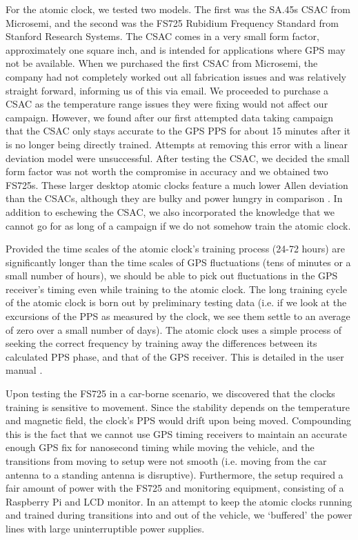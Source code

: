 For the atomic clock, we tested two models. The first was the SA.45s CSAC from Microsemi, and the second was the FS725 Rubidium Frequency Standard from Stanford Research Systems. The CSAC comes in a very small form factor, approximately one square inch, and is intended for applications where GPS may not be available. When we purchased the first CSAC from Microsemi, the company had not completely worked out all fabrication issues and was relatively straight forward, informing us of this via email. We proceeded to purchase a CSAC as the temperature range issues they were fixing would not affect our campaign. However, we found after our first attempted data taking campaign that the CSAC only stays accurate to the GPS PPS for about 15 minutes after it is no longer being directly trained. Attempts at removing this error with a linear deviation model were unsuccessful. 
After testing the CSAC, we decided the small form factor was not worth the compromise in accuracy and we obtained two FS725s. These larger desktop atomic clocks feature a much lower Allen deviation than the CSACs, although they are bulky and power hungry in comparison \cite{fs725spec}. In addition to eschewing the CSAC, we also incorporated the knowledge that we cannot go for as long of a campaign if we do not somehow train the atomic clock. 

Provided the time scales of the atomic clock's training process (24-72 hours) are significantly longer than the time scales of GPS fluctuations (tens of minutes or a small number of hours), we should be able to pick out fluctuations in the GPS receiver's timing even while training to the atomic clock. The long training cycle of the atomic clock is born out by preliminary testing data (i.e. if we look at the excursions of the PPS as measured by the clock, we see them settle to an average of zero over a small number of days). The atomic clock uses a simple process of seeking the correct frequency by training away the differences between its calculated PPS phase, and that of the GPS receiver. This is detailed in the user manual \cite{fs725man}.

Upon testing the FS725 in a car-borne scenario, we discovered that the clocks training is sensitive to movement. Since the stability depends on the temperature and magnetic field, the clock's PPS would drift upon being moved. Compounding this is the fact that we cannot use GPS timing receivers to maintain an accurate enough GPS fix for nanosecond timing while moving the vehicle, and the transitions from moving to setup were not smooth (i.e. moving from the car antenna to a standing antenna is disruptive). Furthermore, the setup required a fair amount of power with the FS725 and monitoring equipment, consisting of a Raspberry Pi and LCD monitor. In an attempt to keep the atomic clocks running and trained during transitions into and out of the vehicle, we `buffered' the power lines with large uninterruptible power supplies. 

